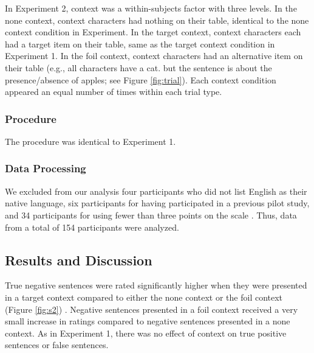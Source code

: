 \documentclass[10pt,letterpaper]{article}
\begin{document}
In Experiment 2, context was a within-subjects factor with three levels. In the none context, context characters had nothing on their table, identical to the none context condition in Experiment. In the target context, context characters each had a target item on their table, same as the target context condition in Experiment 1. In the foil context, context characters had an alternative item on their table (e.g., all characters have a cat. but the sentence is about the presence/absence of apples; see Figure \ref{fig:trial}).  Each context condition appeared an equal number of times within each trial type.  

\subsubsection{Procedure}

The procedure was identical to Experiment 1.

\subsubsection{Data Processing}

We excluded from our analysis four participants who did not list English as their native language, six participants for having participated in a previous pilot study, and 34 participants for using fewer than three points on the scale .  Thus, data from a total of 154 participants were analyzed.  

\subsection{Results and Discussion}

True negative sentences were rated significantly higher when they were presented in a target context compared to either the none context or the foil context (Figure \ref{fig:s2}) .  Negative sentences presented in a foil context received a very small increase in ratings compared to negative sentences presented in a none context. As in Experiment 1, there was no effect of context on true positive sentences or false sentences.  

\end{document}
